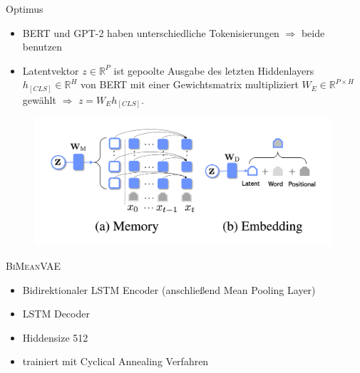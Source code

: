 \begin{frame}{Optimus}
  \begin{itemize}
    \item BERT und GPT-2 haben unterschiedliche Tokenisierungen $\Rightarrow$ beide benutzen 
    \item Latentvektor $z \in \mathbb{R}^P$ ist gepoolte Ausgabe des letzten Hiddenlayers $h_{[CLS]} \in \mathbb{R}^H$ von BERT mit einer Gewichtsmatrix multipliziert $W_{E} \in \mathbb{R}^{P\times H}$ gewählt $\Rightarrow$ $z = W_{E}h_{[CLS]}$.
  \end{itemize}

  \begin{figure}[h]
    \centering
    \includegraphics[width=11cm]{bilder/latent_optimus}
\end{figure}

\end{frame}

\begin{frame}{\textsc{BiMeanVAE}}
 \begin{itemize}
\item Bidirektionaler LSTM Encoder (anschließend Mean Pooling Layer)
\item LSTM Decoder
\item Hiddensize 512
\item trainiert mit Cyclical Annealing Verfahren
 \end{itemize}
\end{frame}

